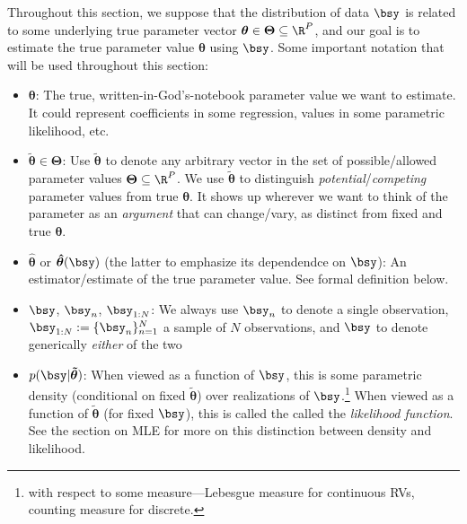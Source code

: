 \documentclass[12pt]{article}
\theoremstyle{plain}
\theoremstyle{definition}
\theoremstyle{remark}
\newcommand{\bstheta}{\boldsymbol{\theta}}
\newcommand{\bsTheta}{\boldsymbol{\Theta}}
\newcommand{\bshattheta}{\boldsymbol{\hat{\theta}}}
\newcommand{\bstildetheta}{\boldsymbol{\tilde{\theta}}}
\newcommand{\nN}{_{n=1}^N}
\begin{document}
Throughout this section, we suppose that the distribution of data $\bsy$
is related to some underlying true parameter vector
$\bstheta\in\bsTheta\subseteq\R^P$, and our goal is to estimate the true
parameter value $\bstheta$ using $\bsy$.
Some important notation that will be used throughout this section:
\begin{itemize}
  \item $\bstheta$: The true, written-in-God's-notebook parameter value
    we want to estimate.
    It could represent coefficients in some regression,
    values in some parametric likelihood, etc.
  \item $\bstildetheta\in\bsTheta$:
    Use $\bstildetheta$ to denote any arbitrary vector in the set of
    possible/allowed parameter values $\bsTheta\subseteq\R^P$.
    We use $\bstildetheta$ to distinguish
    \emph{potential}/\emph{competing} parameter values from true
    $\bstheta$.  It shows up wherever we want to think of the parameter
    as an \emph{argument} that can change/vary, as distinct from fixed
    and true $\bstheta$.
  \item $\bshattheta$ or $\bshattheta(\bsy)$ (the latter to emphasize
    its dependendce on $\bsy$): An estimator/estimate of the true
    parameter value. See formal definition below.
  \item $\bsy$, $\bsy_n$, $\bsy_{1:N}$:
    We always use $\bsy_n$ to denote a single observation,
    $\bsy_{1:N}:=\{\bsy_n\}\nN$ a sample of $N$ observations, and $\bsy$
    to denote generically \emph{either} of the two
  \item $p(\bsy|\bstildetheta)$:
    When viewed as a function of $\bsy$, this is some parametric density
    (conditional on fixed $\bstildetheta$) over realizations of
    $\bsy$.\footnote{%
      with respect to some measure---Lebesgue measure for continuous
      RVs, counting measure for discrete.
    }
    When viewed as a function of $\bstildetheta$ (for fixed $\bsy$),
    this is called the called the \emph{likelihood function}.
    See the section on MLE for more on this distinction between density
    and likelihood.
\end{itemize}
\end{document}

